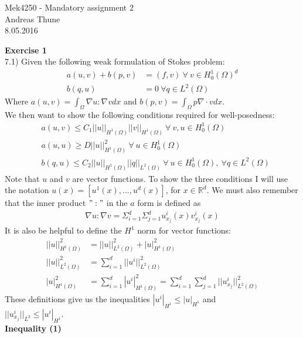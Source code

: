 \documentclass[11pt,a4paper]{report}
\begin{document}
\begin{center}

\LARGE Mek4250 - Mandatory assignment 2
\\
Andreas Thune
\\
\LARGE
8.05.2016

\end{center}
\textbf{Exercise 1}
\\
7.1) Given the following weak formulation of Stokes problem:
\begin{align*}
a(u,v)+b(p,v)&=(f,v) \ \forall \ v \in H_0^1(\Omega)^d\\
b(q,u)&=0 \ \forall q \in L^2(\Omega)
\end{align*}
Where $a(u,v) = \int_{\Omega}\nabla u : \nabla v dx$ and $b(p,v) =\int_{\Omega} p\nabla \cdot v dx$.
\\
We then want to show the following conditions required for well-posedness:
\begin{align}
&a(u,v) \leq C_1 ||u||_{H^1(\Omega)}||v||_{H^1(\Omega)} \ \forall \ v,u \in H_0^1(\Omega)\\
&a(u,u) \geq D||u||_{H^1(\Omega)}^2 \ \forall \ u \in H_0^1(\Omega)\\
&b(q,u) \leq C_2||u||_{H^1(\Omega)}||q||_{L^2(\Omega)} \ \forall \ u \in H_0^1(\Omega), \ \forall q \in L^2(\Omega)
\end{align}
Note that $u$ and $v$ are vector functions. To show the three conditions I will use the notation $u(x)=[u^1(x),...,u^d(x)]$, for $x \in  \mathbb{R}^d$. We must also remember that the inner product $":"$ in the $a$ form is defined as 
\begin{align*}
\nabla u : \nabla v = \Sigma_{i=1}^d\Sigma_{j=1}^d u_{x_j}^i(x)v_{x_j}^i(x)
\end{align*}
It is also be helpful to define the $H^1$ norm for vector functions:
\begin{align*}
||u||_{H^1(\Omega)}^2 &= ||u||_{L^2(\Omega)}^2 + |u|_{H^1(\Omega)}^2 \\
||u||_{L^2(\Omega)}^2 &= \sum_{i=1}^d ||u^i||_{L^2(\Omega)}^2 \\
|u|_{H^1(\Omega)}^2 &= \sum_{i=1}^d |u^i|_{H^1(\Omega)}^2= \sum_{i=1}^d\sum_{j=1}^d ||u_{x_j}^i||_{L^2(\Omega)}^2
\end{align*}
These definitions give us the inequalities $ |u^i|_{H^1} \leq |u|_{H^1}$ and \\$||u_{x_j}^i||_{L^2}\leq |u^i|_{H^1} $.
\\
\textbf{Inequality (1)}
\end{document}
